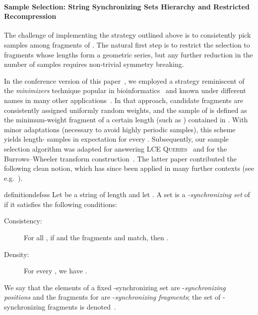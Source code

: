 \documentclass[a4paper]{article}
\theoremstyle{definition}
\theoremstyle{remark}
\newcommand{\LCEQ}{\textsc{LCE Queries}\xspace}
\begin{document}
\paragraph{Sample Selection: String Synchronizing Sets Hierarchy and Restricted Recompression}
The challenge of implementing the strategy outlined above is to consistently pick  samples among  fragments of .
The natural first step is to restrict the selection to  fragments whose lengths form a geometric series,
but any further reduction in the number of samples requires non-trivial symmetry breaking.

In the conference version of this paper~\cite{DBLP:conf/soda/KociumakaRRW15}, we employed a strategy reminiscent of the \emph{minimizers} technique popular in bioinformatics~\cite{DBLP:journals/bioinformatics/RobertsHHMY04,Wood_2014,DBLP:journals/bioinformatics/DeorowiczKGD15,DBLP:journals/bioinformatics/Li18}
and known under different names in many other applications~\cite{DBLP:conf/sigmod/SchleimerWA03,DBLP:conf/icdm/SorokinaGWG06,DBLP:journals/ce/ButakovS09,DBLP:journals/tissec/PonecGWB10}.
In that approach, candidate fragments are consistently assigned uniformly random weights, and the sample of  is defined as the minimum-weight fragment of a certain length (such as ) contained in . 
With minor adaptations (necessary to avoid highly periodic samples), this scheme yields  length- samples in expectation for every .
Subsequently, our sample selection algorithm was adapted for answering \LCEQ~\cite{DBLP:conf/soda/BirenzwigeGP20,phd} and for the Burrows--Wheeler transform construction~\cite{Kempa2019}. The latter paper contributed the following clean notion, which has since been applied in many further contexts (see e.g.~\cite{DBLP:conf/focs/KempaK20,DBLP:conf/esa/Charalampopoulos21,DBLP:conf/stoc/KempaK22,DBLP:conf/soda/JinN23}).

\begin{restatable}{definition}{defsss}\label{def:sss}
  Let  be a string of length  and let .
  A set  is a
  \emph{-synchronizing set} of  if it satisfies the following conditions:
  \begin{description}
\item[Consistency:] For all , if  and the fragments  and  match, then .
\item[Density:]
For every , we have .
\end{description}
We say that the elements of a fixed -synchronizing set  are -\emph{synchronizing positions} and the fragments  for  are -\emph{synchronizing fragments}; the set of -synchronizing fragments is denoted~.
\end{restatable}
\end{document}
